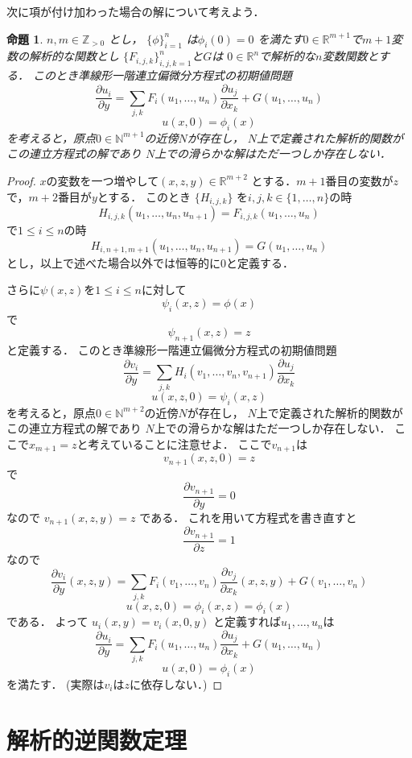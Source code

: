 \documentclass[leqno, a4paper, 12pt]{jsarticle}
\newtheorem{prop}[thm]{命題}
\newcommand{\nn}{\mathbb{N}}
\newcommand{\zz}{\mathbb{Z}}
\newcommand{\rr}{\mathbb{R}}
\begin{document}
次に項が付け加わった場合の解について考えよう．
\begin{prop}\label{prop:ck}
$n, m\in \zz_{>0}$
とし，
$\{\phi\}_{i=1}^n$
は$\phi_i(0)=0$
を満たす$0\in \rr^{m+1}$で$m+1$変数の解析的な関数とし
$\{F_{i, j, k}\}_{i, j, k=1}^n$と$G$は
$0\in \rr^n$で解析的な$n$変数関数とする．
このとき準線形一階連立偏微分方程式の初期値問題
\[
\frac{\partial u_i}{\partial y}=\sum_{j, k}F_i(u_1, \dots, u_n)\frac{\partial u_j}{\partial x_k}+G(u_1, \dots, u_n)
\]
\[
u(x, 0)=\phi_i(x)
\]
を考えると，原点$0\in \nn^{m+1}$の近傍$N$が存在し，
$N$上で定義された解析的関数がこの連立方程式の解であり
$N$上での滑らかな解はただ一つしか存在しない．

\end{prop}
\begin{proof}
$x$の変数を一つ増やして$(x, z, y )\in \rr^{m+2}$
とする．$m+1$番目の変数が$z$で，$m+2$番目が$y$とする．
このとき
$\{H_{i, j, k}\}$
を$i, j, k\in \{1, \dots, n\}$の時
\[
H_{i, j, k}(u_1, \dots, u_n, u_{n+1})=F_{i, j, k}(u_1, \dots, u_n)
\]
で$1\le i\le n$の時
\[
H_{i, n+1, m+1}(u_1, \dots, u_n, u_{n+1})=G(u_1, \dots, u_n)
\]
とし，以上で述べた場合以外では恒等的に$0$と定義する．

さらに$\psi(x, z)$を$1\le i\le n$に対して
\[
\psi_i(x, z)=\phi(x)
\]
で
\[
\psi_{n+1}(x, z)=z
\]
と定義する．
このとき準線形一階連立偏微分方程式の初期値問題
\[
\frac{\partial v_i}{\partial y}=\sum_{j, k}H_i(v_1, \dots, v_n, v_{n+1})\frac{\partial u_j}{\partial x_k}
\]
\[
u(x, z,  0)=\psi_i(x, z)
\]
を考えると，原点$0\in \nn^{m+2}$の近傍$N$が存在し，
$N$上で定義された解析的関数がこの連立方程式の解であり
$N$上での滑らかな解はただ一つしか存在しない．
ここで$x_{m+1}=z$と考えていることに注意せよ．
ここで$v_{n+1}$は
\[
v_{n+1}(x, z, 0)=z
\]
で
\[
\frac{\partial v_{n+1}}{\partial y}=0
\]
なので
$v_{n+1}(x, z, y)=z$
である．
これを用いて方程式を書き直すと
\[
\frac{\partial v_{n+1}}{\partial z}=1
\]
なので
\[
\frac{\partial v_i}{\partial y}(x, z, y)=\sum_{j, k}F_i(v_1, \dots, v_n)\frac{\partial v_j}{\partial x_k}(x, z, y)+G(v_1, \dots, v_n)
\]
\[
u(x, z,  0)=\phi_i(x, z)=\phi_i(x)
\]
である．
よって
$u_i(x, y)=v_i(x, 0, y)$
と定義すれば$u_1, \dots, u_n$は
\[
\frac{\partial u_i}{\partial y}=\sum_{j, k}F_i(u_1, \dots, u_n)\frac{\partial u_j}{\partial x_k}+G(u_1, \dots, u_n)
\]
\[
u(x, 0)=\phi_i(x)
\]
を満たす．
(実際は$v_i$は$z$に依存しない．)
\end{proof}


\section{解析的逆関数定理}
\end{document}
